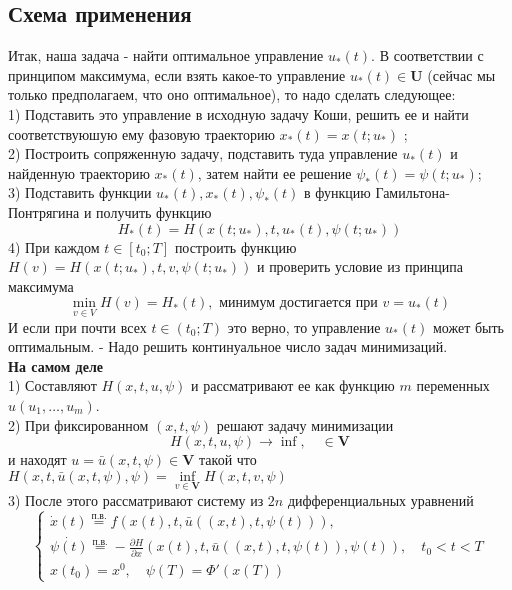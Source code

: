 \documentclass[A4]{article}
\begin{document}
\subsection{Схема применения}
Итак, наша задача - найти оптимальное управление $ u_{*}(t) $. В соответствии с принципом максимума, если взять какое-то управление $ u_{*}(t) \in \mathbf{U} $ (сейчас мы только предполагаем, что оно оптимальное), то надо сделать следующее:\\
1) Подставить это управление в исходную задачу Коши, решить ее и найти соответствуюшую ему фазовую траекторию $ x_{*}(t)=x\left(t ; u_{*}\right)$ ;\\ 
2) Построить сопряженную задачу, подставить туда управление $ u_{*}(t) $ и найденную траекторию $ x_{*}(t)$, затем найти ее решение $ \psi_{*}(t)=\psi\left(t ; u_{*}\right) $;\\ 
3) Подставить функции $ u_{*}(t), x_{*}(t), \psi_{*}(t) $ в функцию Гамильтона-Понтрягина и получить функцию
\begin{equation*}
H_{*}(t)=H\left(x\left(t ; u_{*}\right), t, u_{*}(t), \psi\left(t ; u_{*}\right)\right)
\end{equation*}
4) При каждом $ t \in\left[t_{0} ; T\right] $ построить функцию $ H(v)=H\left(x\left(t ; u_{*}\right), t, v, \psi\left(t ; u_{*}\right)\right) $ и проверить условие из принципа максимума
\begin{equation*}
\min _{v \in V} H(v)=H_{*}(t), \text { минимум достигается при } v=u_{*}(t)
\end{equation*}
И если при почти всех $ t \in\left(t_{0} ; T\right) $ это верно, то управление $ u_{*}(t) $ может быть оптимальным.  - Надо решить континуальное число задач минимизаций.\\
\textbf{На самом деле} \\
1) Составляют $H(x,t,u,\psi)$ и рассматривают ее как функцию $m$ переменных $u(u_1,\ldots,u_m)$.\\
2) При фиксированном $(x,t,\psi)$ решают задачу минимизации
\begin{equation*}
H(x,t,u,\psi)\rightarrow\inf,\quad \in\mathbf{V}
\end{equation*}
и находят $u=\bar{u}(x,t,\psi)\in\mathbf{V}$ такой что $H(x,t,\bar{u}(x,t,\psi),\psi)=\inf\limits_{v\in\mathbf{V}}H(x,t,v,\psi)$\\
3) После этого рассматривают систему из $2n$ дифференциальных уравнений
\begin{equation*}
\left\{\begin{array}{l}
\dot{x}(t)\stackrel{\text{п.в.}}{=}f(x(t),t,\bar{u}((x,t),t,\psi(t))),\\
\dot{\psi(t)}\stackrel{\text{п.в.}}{=}-\frac{\partial H}{\partial x}(x(t),t,\bar{u}((x,t),t,\psi(t)),\psi(t)),\quad t_0<t<T\\
x(t_0)=x^0,\quad \psi(T)=\Phi'(x(T))
\end{array}\right. 
\end{equation*}
\end{document}

